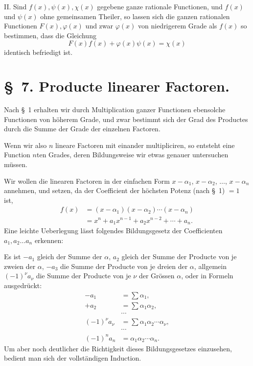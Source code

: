 \documentclass[11pt]{article}
\begin{document}
II. Sind $f(x),\psi(x),\chi(x)$ gegebene ganze rationale Functionen, und $f(x)$ und $\psi(x)$ ohne gemeinsamen Theiler, so lassen sich die ganzen rationalen Functionen $F(x),\varphi(x)$ und zwar $\varphi(x)$ von niedrigerem Grade als $f(x)$ so bestimmen, dass die Gleichung
\begin{equation}
 F(x)f(x)+\varphi(x)\psi(x)=\chi(x)
\tag{26}
\end{equation}
identisch befriedigt ist.

\section*{\S~7. Producte linearer Factoren.}

Nach \S~1 erhalten wir durch Multiplication ganzer Functionen ebensolche Functionen von höherem Grade, und zwar bestimmt sich der Grad des Productes durch die Summe der Grade der einzelnen Factoren.

Wenn wir also $n$ lineare Factoren mit einander multipliciren, so entsteht eine Function $n$ten Grades, deren Bildungsweise wir etwas genauer untersuchen müssen.

Wir wollen die linearen Factoren in der einfachen Form $x-\alpha_1$, $x-\alpha_2$, $\ldots$, $x-\alpha_n$ annehmen, und setzen, da der Coefficient der höchsten Potenz (nach \S~1) $=1$ ist,
\begin{equation}
\begin{aligned}
 f(x)&=(x-\alpha_1)(x-\alpha_2)\cdots(x-\alpha_n)\\
 &=x^n+a_1x^{n-1}+a_2x^{n-2}+\cdots+a_n.
\end{aligned}
\tag{1}
\end{equation}
Eine leichte Ueberlegung lässt folgendes Bildungsgesetz der Coefficienten $a_1,a_2\ldots a_n$ erkennen:

Es ist $-a_1$ gleich der Summe der $\alpha$, $a_2$ gleich der Summe der Producte von je zweien der $\alpha$, $-a_3$ die Summe der Producte von je dreien der $\alpha$, allgemein $(-1)^\nu a_\nu$ die Summe der Producte von je $\nu$ der Grössen $\alpha$, oder in Formeln ausgedrückt:
\begin{equation}
\begin{aligned}
-a_1&=\sum \alpha_1,\\
+a_2&=\sum \alpha_1\alpha_2,\\
&\cdots\\
(-1)^\nu a_\nu&=\sum \alpha_1\alpha_2\cdots\alpha_\nu,\\
&\cdots\\
(-1)^n a_n&=\alpha_1\alpha_2\cdots\alpha_n.
\end{aligned}
\tag{2}
\end{equation}
Um aber noch deutlicher die Richtigkeit dieses Bildungsgesetzes einzusehen, bedient man sich der vollständigen Induction.
\end{document}
